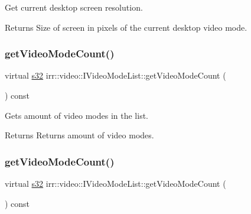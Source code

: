 Get current desktop screen resolution. 

\begin{DoxyReturn}{Returns}
Size of screen in pixels of the current desktop video mode. 
\end{DoxyReturn}
\mbox{\label{classirr_1_1video_1_1IVideoModeList_a84326f1c6faa1cbbb6f90bdac66714dd}} 
\subsubsection{\texorpdfstring{get\+Video\+Mode\+Count()}{getVideoModeCount()}\hspace{0.1cm}{\footnotesize\ttfamily [1/2]}}
{\footnotesize\ttfamily virtual \hyperlink{namespaceirr_ac66849b7a6ed16e30ebede579f9b47c6}{s32} irr\+::video\+::\+I\+Video\+Mode\+List\+::get\+Video\+Mode\+Count (\begin{DoxyParamCaption}{ }\end{DoxyParamCaption}) const\hspace{0.3cm}{\ttfamily [pure virtual]}}



Gets amount of video modes in the list. 

\begin{DoxyReturn}{Returns}
Returns amount of video modes. 
\end{DoxyReturn}
\mbox{\label{classirr_1_1video_1_1IVideoModeList_a84326f1c6faa1cbbb6f90bdac66714dd}} 
\subsubsection{\texorpdfstring{get\+Video\+Mode\+Count()}{getVideoModeCount()}\hspace{0.1cm}{\footnotesize\ttfamily [2/2]}}
{\footnotesize\ttfamily virtual \hyperlink{namespaceirr_ac66849b7a6ed16e30ebede579f9b47c6}{s32} irr\+::video\+::\+I\+Video\+Mode\+List\+::get\+Video\+Mode\+Count (\begin{DoxyParamCaption}{ }\end{DoxyParamCaption}) const\hspace{0.3cm}{\ttfamily [pure virtual]}}



